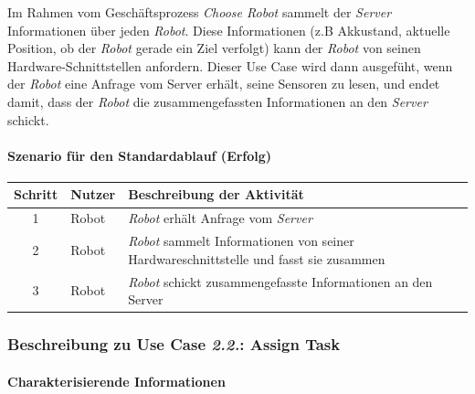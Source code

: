 				Im Rahmen vom Geschäftsprozess \emph{Choose Robot} sammelt der \emph{Server}
				Informationen über jeden \emph{Robot}. Diese Informationen (z.B
				Akkustand, aktuelle Position, ob der \emph{Robot} gerade ein Ziel verfolgt)
				kann der \emph{Robot} von seinen Hardware-Schnittstellen anfordern. Dieser
				Use Case wird dann ausgefüht, wenn der \emph{Robot} eine Anfrage vom
				Server erhält, seine Sensoren zu lesen, und endet damit, dass der \emph{Robot}
				die zusammengefassten Informationen an den \emph{Server} schickt.
				
				\paragraph*{Szenario für den Standardablauf (Erfolg)}
				
				\begin{table}[H]
					\centering
					\begin{tabularx}{\textwidth}{|c|p{2cm}|X|}
						\hline
						Schritt & Nutzer & Beschreibung der Aktivität \\ \hline
						1 & Robot & \emph{Robot} erhält Anfrage vom \emph{Server} \\
						2 & Robot & \emph{Robot} sammelt Informationen von seiner Hardwareschnittstelle und fasst sie zusammen \\
						3 & Robot & \emph{Robot} schickt zusammengefasste Informationen an den Server \\
						\hline
					\end{tabularx}
				\end{table}
				
				
				\pagebreak
				
			\subsubsection{Beschreibung zu Use Case \emph{2.2.}: Assign Task}
				
				\paragraph*{Charakterisierende Informationen}
				
